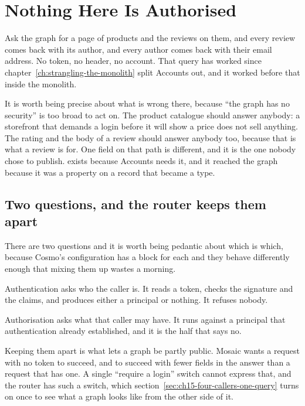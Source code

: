 \section{Nothing Here Is Authorised}
\label{sec:ch15-nothing-here-is-authorised}
%

Ask the graph for a page of products and the reviews on them, and every review
comes back with its author, and every author comes back with their email
address. No token, no header, no account. That query has worked since
chapter~\ref{ch:strangling-the-monolith} split Accounts out, and it worked
before that inside the monolith.

It is worth being precise about what is wrong there, because \enquote{the graph has
no security} is too broad to act on. The product catalogue should answer
anybody: a storefront that demands a login before it will show a price does not
sell anything. The rating and the body of a review should answer anybody too,
because that is what a review is for. One field on that path is different, and
it is the one nobody chose to publish.  exists because
Accounts needs it, and it reached the graph because it was a property on a
record that became a type.

\subsection*{Two questions, and the router keeps them apart}

%
There are two questions and it is worth being pedantic about which is which,
because Cosmo's configuration has a block for each and they behave differently
enough that mixing them up wastes a morning.

Authentication asks who the caller is. It reads a token, checks the signature
and the claims, and produces either a principal or nothing. It refuses nobody.

Authorisation asks what that caller may have. It runs against a principal that
authentication already established, and it is the half that says no.

Keeping them apart is what lets a graph be partly public. Mosaic wants a
request with no token to succeed, and to succeed with fewer fields in the
answer than a request that has one. A single \enquote{require a login} switch
cannot express that, and the router has such a switch, which
section~\ref{sec:ch15-four-callers-one-query} turns on once to see what a graph
looks like from the other side of it.

